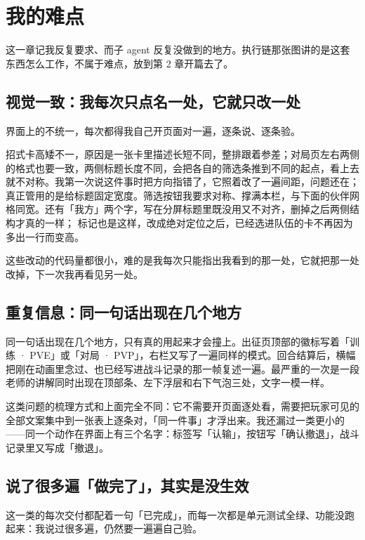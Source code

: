 \section{我的难点}

这一章记我反复要求、而子 agent 反复没做到的地方。执行链那张图讲的是这套东西怎么工作，不属于难点，放到第 2 章开篇去了。

\subsection{视觉一致：我每次只点名一处，它就只改一处}

界面上的不统一，每次都得我自己开页面对一遍，逐条说、逐条验。

招式卡高矮不一，原因是一张卡里描述长短不同，整排跟着参差；对局页左右两侧的格式也要一致，两侧标题长度不同，会把各自的筛选条推到不同的起点，看上去就不对称。我第一次说这件事时把方向指错了，它照着改了一遍间距，问题还在；真正管用的是给标题固定宽度。筛选按钮我要求对称、撑满本栏，与下面的伙伴网格同宽。还有「我方」两个字，写在分屏标题里既没用又不对齐，删掉之后两侧结构才真的一样； 标记也是这样，改成绝对定位之后，已经选进队伍的卡不再因为多出一行而变高。

这些改动的代码量都很小，难的是我每次只能指出我看到的那一处，它就把那一处改掉，下一次我再看见另一处。

\subsection{重复信息：同一句话出现在几个地方}

同一句话出现在几个地方，只有真的用起来才会撞上。出征页顶部的徽标写着「训练 · PVE」或「对局 · PVP」，右栏又写了一遍同样的模式。回合结算后，横幅把刚在动画里念过、也已经写进战斗记录的那一帧复述一遍。最严重的一次是一段老师的讲解同时出现在顶部条、左下浮层和右下气泡三处，文字一模一样。

这类问题的梳理方式和上面完全不同：它不需要开页面逐处看，需要把玩家可见的全部文案集中到一张表上逐条对，「同一件事」才浮出来。我还漏过一类更小的——同一个动作在界面上有三个名字：标签写「认输」，按钮写「确认撤退」，战斗记录里又写成「撤退」。

\subsection{说了很多遍「做完了」，其实是没生效}

这一类的每次交付都配着一句「已完成」，而每一次都是单元测试全绿、功能没跑起来：我说过很多遍，仍然要一遍遍自己验。


